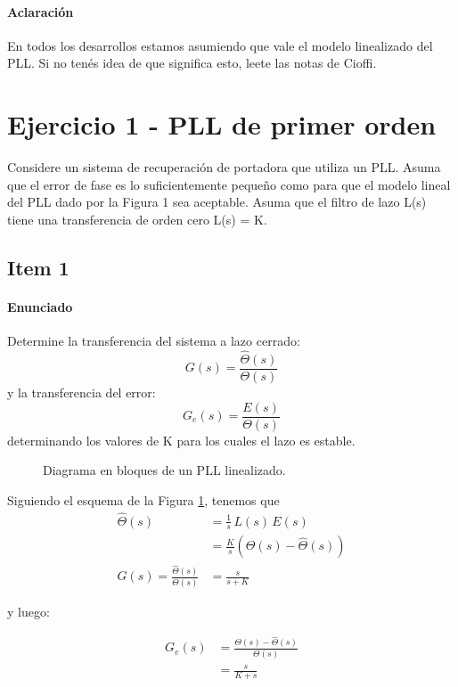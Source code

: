 \paragraph{Aclaración} En todos los desarrollos estamos asumiendo que vale el modelo linealizado del PLL. Si no tenés idea de que significa esto, leete las notas de Cioffi\cite{Cio6}.

\section{Ejercicio 1 - PLL de primer orden}
Considere un sistema de recuperación de portadora que utiliza un PLL. Asuma que el error de fase es lo suficientemente pequeño como para que el modelo lineal del PLL dado por la Figura 1 sea aceptable. Asuma que el filtro de lazo L(s) tiene una transferencia de orden cero L(s) = K.

\subsection{Item 1}\paragraph{Enunciado}Determine la transferencia del sistema a lazo cerrado: \[G(s) = \frac{\hat{\Theta}(s)}{\Theta(s)}\] y la transferencia del error: \[G_e(s)=\frac{E(s)}{\Theta(s)}\] determinando los valores de K para los cuales el lazo es estable.

\begin{figure}[h]
	\centering
	
	\caption{Diagrama en bloques de un PLL linealizado.}
	\label{fig:pll_lineal}
\end{figure}

Siguiendo el esquema de la Figura \ref{fig:pll_lineal}, tenemos que
\begin{align}
\hat{\Theta}(s) &= \frac{1}{s}\, L(s)\, E(s)\nonumber\\
				&= \frac{K}{s} (\Theta(s) - \hat{\Theta}(s))\nonumber\\ 
G(s) = \frac{\hat{\Theta}(s)}{\Theta(s)} &= \frac{s}{s+K} \label{ec:ej1:G}
\end{align}

y luego:

\begin{align}
G_e(s) 	&= \frac{\Theta(s)-\hat{\Theta}(s)}{\Theta(s)}\nonumber\\
		&= \frac{s}{K+s} \label{ec:ej1:Ge}
\end{align}

